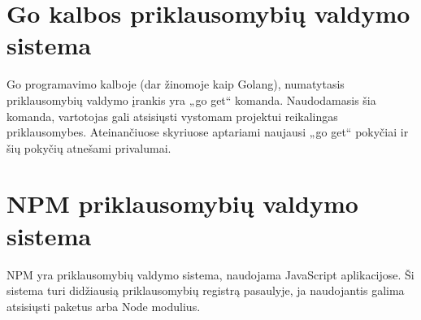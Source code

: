 \section{Go kalbos priklausomybių valdymo sistema}

Go programavimo kalboje (dar žinomoje kaip Golang), numatytasis priklausomybių valdymo įrankis yra „go get“
komanda. Naudodamasis šia komanda, vartotojas gali atsisiųsti vystomam projektui reikalingas priklausomybes.
Ateinančiuose skyriuose aptariami naujausi „go get“ pokyčiai ir šių pokyčių atnešami privalumai.







\section{NPM priklausomybių valdymo sistema}

NPM yra priklausomybių valdymo sistema, naudojama JavaScript aplikacijose.
Ši sistema turi didžiausią priklausomybių registrą pasaulyje, ja naudojantis galima atsisiųsti paketus arba Node modulius.



